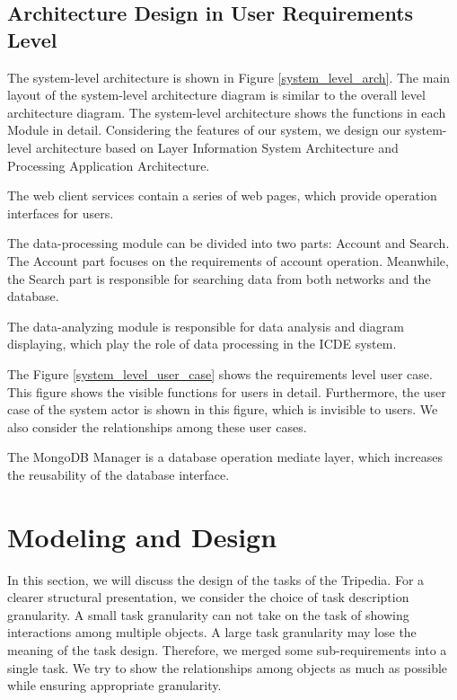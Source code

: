 \documentclass[conference]{IEEEtran}
\begin{document}
\subsection{\textbf{Architecture Design in User Requirements Level}}

The system-level architecture is shown in Figure \ref{system_level_arch}. The main layout of the system-level architecture diagram is similar to the overall level architecture diagram. The system-level architecture shows the functions in each Module in detail. Considering the features of our system, we design our system-level architecture based on Layer Information System Architecture and Processing Application Architecture.

The web client services contain a series of web pages, which provide operation interfaces for users.

The data-processing module can be divided into two parts: Account and Search. The Account part focuses on the requirements of account operation. Meanwhile, the Search part is responsible for searching data from both networks and the database.

The data-analyzing module is responsible for data analysis and diagram displaying, which play the role of data processing in the ICDE system.

The Figure \ref{system_level_user_case} shows the requirements level user case. This figure shows the visible functions for users in detail. Furthermore, the user case of the system actor is shown in this figure, which is invisible to users. We also consider the relationships among these user cases.


The MongoDB Manager is a database operation mediate layer, which increases the reusability of the database interface.

\section{\textbf{Modeling and Design}}

In this section, we will discuss the design of the tasks of the Tripedia. For a clearer structural presentation, we consider the choice of task description granularity. A small task granularity can not take on the task of showing interactions among multiple objects. A large task granularity may lose the meaning of the task design. Therefore, we merged some sub-requirements into a single task. We try to show the relationships among objects as much as possible while ensuring appropriate granularity. 
\end{document}
